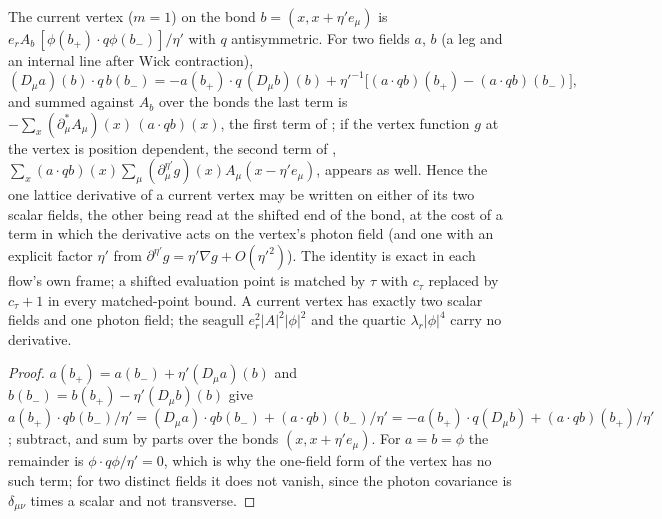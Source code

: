 \begin{lemma}\label{rot:h1s:cv}
The current vertex \cite[(3.22)]{K1} ($m=1$) on the bond $b=(x,x+\eta'e_\mu)$ is $e_rA_b\,[\phi(b_+)\cdot q\phi(b_-)]/\eta'$ with $q$ antisymmetric. For two fields $a$, $b$ (a leg and an internal line after Wick contraction),
\[
(D_\mu a)(b)\cdot q\,b(b_-)=-a(b_+)\cdot q\,(D_\mu b)(b)+\eta'^{-1}\big[(a\cdot qb)(b_+)-(a\cdot qb)(b_-)\big],
\]
and summed against $A_b$ over the bonds the last term is $-\sum_x(\partial^*_\mu A_\mu)(x)\,(a\cdot qb)(x)$, the first term of \cite[(2.8)]{Ba3}; if the vertex function $g$ at the vertex is position dependent, the second term of \cite[(2.8)]{Ba3}, $\sum_x(a\cdot qb)(x)\sum_\mu(\partial^{\eta'}_\mu g)(x)A_\mu(x-\eta'e_\mu)$, appears as well. Hence the one lattice derivative of a current vertex may be written on either of its two scalar fields, the other being read at the shifted end of the bond, at the cost of a term in which the derivative acts on the vertex's photon field (and one with an explicit factor $\eta'$ from $\partial^{\eta'}g=\eta'\nabla g+O(\eta'^2)$). The identity is exact in each flow's own frame; a shifted evaluation point is matched by $\tau$ with $c_\tau$ replaced by $c_\tau+1$ in every matched-point bound. A current vertex has exactly two scalar fields and one photon field; the seagull $e_r^2|A|^2|\phi|^2$ and the quartic $\lambda_r|\phi|^4$ carry no derivative.
\end{lemma}
\begin{proof}
$a(b_+)=a(b_-)+\eta'(D_\mu a)(b)$ and $b(b_-)=b(b_+)-\eta'(D_\mu b)(b)$ give $a(b_+)\cdot qb(b_-)/\eta'=(D_\mu a)\cdot qb(b_-)+(a\cdot qb)(b_-)/\eta'=-a(b_+)\cdot q(D_\mu b)+(a\cdot qb)(b_+)/\eta'$; subtract, and sum by parts over the bonds $(x,x+\eta'e_\mu)$. For $a=b=\phi$ the remainder is $\phi\cdot q\phi/\eta'=0$, which is why the one-field form of the vertex has no such term; for two distinct fields it does not vanish, since the photon covariance is $\delta_{\mu\nu}$ times a scalar and not transverse.
\end{proof}
